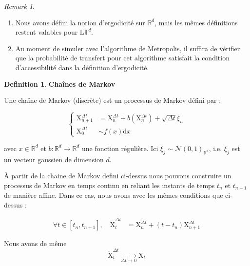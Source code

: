 \documentclass[11pt]{article}
\theoremstyle{definition}
\newtheorem{definition}{Definition}[section]
\theoremstyle{remark}
\newtheorem*{remark}{Remark}
\begin{document}
\begin{remark}
\begin{enumerate}
\item 
Nous avons défini la notion d'ergodicité sur $\mathbb{R}^d$, mais les mêmes définitions restent valables pour $\mathrm{L}\mathbb{T}^d$.
\item 
Au moment de simuler avec l'algorithme de Metropolis, il suffira de vérifier que la probabilité de transfert pour cet algorithme satisfait la condition d'accessibilité dans la définition d'ergodicité.

\end{enumerate}
\end{remark}


\begin{definition}{\textbf{Chaînes de Markov}}

Une chaîne de Markov (discrète) est un processus de Markov défini par :

\begin{equation}
\left\{ 
  \begin{array}{ll}
  \mathrm{X}_{n+1}^{\Delta t} &= \mathrm{X}_{n}^{\Delta t} + b(\mathrm{X}_{n}^{\Delta t}) + \sqrt{\Delta t} \xi_{n}
  \\
  \mathrm{X}_{0}^{\Delta t} &\sim  f(x) \mathrm{d}x 
  \end{array}
\right.
\end{equation}



avec $x \in \mathbb{R}^d$ et $b: \mathbb{R}^d \to \mathbb{R}^d$ une fonction régulière. Ici $\xi_{j} \sim \mathcal{N}(0,1)_{\mathbb{R}^d}$, i.e. $\xi_{j}$ est un vecteur gaussien de dimension $d$. 
\end{definition}

À partir de la chaine de Markov defini ci-dessus nous pouvons construire un processus de Markov en temps continu en reliant les instants de temps $t_n$ et $t_{n+1}$ de manière affine. Dans ce cas, nous avons avec les mêmes conditions que ci-dessus :

\begin{align}
\forall t \in [t_n,t_{n+1}],\quad\tilde{\mathrm{X}}_{t}^{\Delta t} &= \mathrm{X}_{n}^{\Delta t} + (t-t_n) \mathrm{X}_{n+1}^{\Delta t} 
\end{align}

Nous avons de même 
\begin{equation}
\tilde{\mathrm{X}}_{t}^{\Delta t} \underset{\Delta t \to 0}{\longrightarrow} \mathrm{X}_t
\end{equation}
\end{document}
